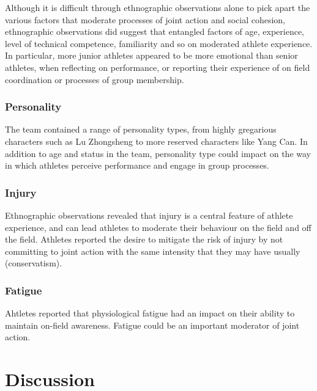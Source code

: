 \begin{CJK}{UTF8}{gbsn}
Although it is difficult through ethnographic observations alone to pick apart the various factors that moderate processes of joint action and social cohesion, ethnographic observations did suggest that entangled factors of age, experience, level of technical competence, familiarity and so on moderated athlete experience.  In particular, more junior athletes appeared to be more emotional than senior athletes, when reflecting on performance, or reporting their experience of on field coordination or processes of group membership.

        \subsubsection{Personality}
The team contained a range of personality types, from highly gregarious characters such as Lu Zhongsheng to more reserved characters like Yang Can.  In addition to age and status in the team, personality type could impact on the way in which athletes perceive performance and engage in group processes.

        \subsubsection{Injury}


Ethnographic observations revealed that injury is a central feature of athlete experience, and can lead athletes to moderate their behaviour on the field and off the field.  Athletes reported the desire to mitigate the risk of injury by not committing to joint action with the same intensity that they may have usually (conservatism).


        \subsubsection{Fatigue}

Ahtletes reported that physiological fatigue had an impact on their ability to maintain on-field awareness.  Fatigue could be an important moderator of joint action.




\section{Discussion}



\end{CJK}
